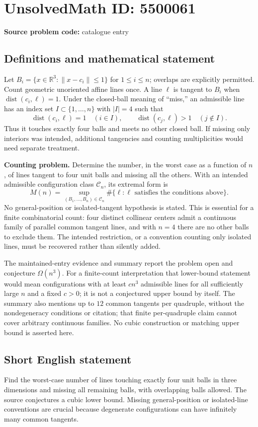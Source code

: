 \documentclass[11pt]{article}
\newcommand{\R}{\mathbb{R}}
\begin{document}
\section*{UnsolvedMath ID: 5500061}
\textbf{Source problem code:} catalogue entry
\subsection{Definitions and mathematical statement}
Let $B_i=\{x\in\R^3:\|x-c_i\|\leq1\}$ for $1\leq i\leq n$; overlaps are explicitly permitted. Count geometric unoriented affine lines once. A line $\ell$ is tangent to $B_i$ when $\operatorname{dist}(c_i,\ell)=1$. Under the closed-ball meaning of ``miss,'' an admissible line has an index set $I\subset\{1,\ldots,n\}$ with $|I|=4$ such that
\[
 \operatorname{dist}(c_i,\ell)=1\quad(i\in I),\qquad
 \operatorname{dist}(c_j,\ell)>1\quad(j\notin I).
\]
Thus it touches exactly four balls and meets no other closed ball. If missing only interiors was intended, additional tangencies and counting multiplicities would need separate treatment.

\textbf{Counting problem.} Determine the number, in the worst case as a function of $n$, of lines tangent to four unit balls and missing all the others. With an intended admissible configuration class $\mathcal C_n$, its extremal form is
\[
 M(n)=\sup_{(B_1,\ldots,B_n)\in\mathcal C_n}
       \#\{\ell:\ell\text{ satisfies the conditions above}\}.
\]
No general-position or isolated-tangent hypothesis is stated. This is essential for a finite combinatorial count: four distinct collinear centers admit a continuous family of parallel common tangent lines, and with $n=4$ there are no other balls to exclude them. The intended restriction, or a convention counting only isolated lines, must be recovered rather than silently added.

The maintained-entry evidence and summary report the problem open and conjecture $\Omega(n^3)$. For a finite-count interpretation that lower-bound statement would mean configurations with at least $cn^3$ admissible lines for all sufficiently large $n$ and a fixed $c>0$; it is not a conjectured upper bound by itself. The summary also mentions up to $12$ common tangents per quadruple, without the nondegeneracy conditions or citation; that finite per-quadruple claim cannot cover arbitrary continuous families. No cubic construction or matching upper bound is asserted here.
\subsection{Short English statement}
Find the worst-case number of lines touching exactly four unit balls in three dimensions and missing all remaining balls, with overlapping balls allowed. The source conjectures a cubic lower bound. Missing general-position or isolated-line conventions are crucial because degenerate configurations can have infinitely many common tangents.
\end{document}
